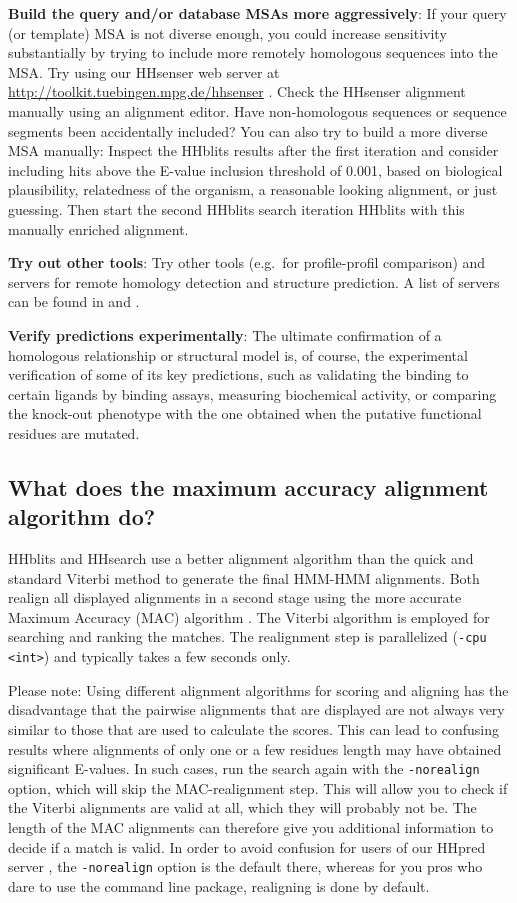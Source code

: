 \documentclass[11pt,a4paper]{article}
\begin{document}
{\bf Build the query and/or database MSAs more aggressively}:
If your query (or template) MSA is not diverse enough, you could increase sensitivity substantially by trying to include more remotely homologous sequences into the MSA. Try using our HHsenser web server at \url{http://toolkit.tuebingen.mpg.de/hhsenser} \cite{Soding:2006b}. Check the HHsenser alignment manually using an alignment editor. Have non-homologous sequences or sequence segments been accidentally included? You can also try to build a more diverse MSA manually: Inspect the HHblits results after the first iteration and consider including hits above the E-value inclusion threshold of 0.001, based on biological plausibility, relatedness of the organism, a reasonable looking alignment, or just guessing. Then start the second HHblits search iteration HHblits with this manually enriched alignment. 

{\bf Try out other tools}:
Try other tools (e.g.\ for profile-profil comparison) and servers for remote homology detection and structure prediction. 
A list of servers can be found in \cite{Mariani:2011} and \cite{Battey:2007}.

{\bf Verify predictions experimentally}: 
The ultimate confirmation of a homologous relationship or structural model is, of course, the experimental verification of some of its key predictions, such as validating the binding to certain ligands by binding assays, measuring biochemical activity, or comparing the knock-out phenotype with the one obtained when the putative functional residues are mutated.


\subsection{What does the maximum accuracy alignment algorithm do?} \label{MAC}
HHblits and HHsearch use a better alignment algorithm than the quick and 
standard Viterbi method to generate the final HMM-HMM alignments. Both realign
all displayed alignments in a second stage using the more accurate Maximum Accuracy 
(MAC) algorithm \cite{Durbin:2008,Biegert:2008}. The Viterbi algorithm is employed 
for searching and ranking the matches. The realignment step is parallelized 
(\verb`-cpu <int>`) and typically takes a few seconds only.    

Please note: Using different alignment algorithms for scoring and aligning has the 
disadvantage that the pairwise alignments that are displayed are not always very similar to 
those that are used to calculate the scores. This can lead to confusing results 
where alignments of only one or a few residues length may have obtained significant
E-values. In such cases, run the search again with the \verb`-norealign` option, which will 
skip the MAC-realignment step. This will allow you to check if the Viterbi alignments 
are valid at all, which they will probably not be. The length of the MAC alignments 
can therefore give you additional information to decide if a match is valid. In order
to avoid confusion for users of our HHpred server \cite{Soding:2005b, Hildebrand:2009}, 
the \verb`-norealign` option is the default there, whereas for you pros who dare to use 
the command line package, realigning is done by default.
\end{document}
